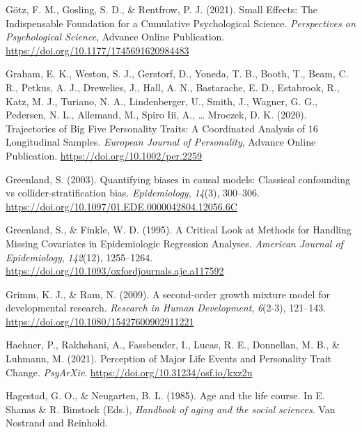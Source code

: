\documentclass[
  english,
  man,floatsintext]{apa7}
\begin{document}
\leavevmode\hypertarget{ref-gotzSmallEffectsIndispensable2021}{}%
Götz, F. M., Gosling, S. D., \& Rentfrow, P. J. (2021). Small Effects: The Indispensable Foundation for a Cumulative Psychological Science. \emph{Perspectives on Psychological Science}, Advance Online Publication. \url{https://doi.org/10.1177/1745691620984483}

\leavevmode\hypertarget{ref-grahamTrajectoriesBigFive2020}{}%
Graham, E. K., Weston, S. J., Gerstorf, D., Yoneda, T. B., Booth, T., Beam, C. R., Petkus, A. J., Drewelies, J., Hall, A. N., Bastarache, E. D., Estabrook, R., Katz, M. J., Turiano, N. A., Lindenberger, U., Smith, J., Wagner, G. G., Pedersen, N. L., Allemand, M., Spiro Iii, A., \ldots{} Mroczek, D. K. (2020). Trajectories of Big Five Personality Traits: A Coordinated Analysis of 16 Longitudinal Samples. \emph{European Journal of Personality}, Advance Online Publication. \url{https://doi.org/10.1002/per.2259}

\leavevmode\hypertarget{ref-greenlandQuantifyingBiasesCausal2003}{}%
Greenland, S. (2003). Quantifying biases in causal models: Classical confounding vs collider-stratification bias. \emph{Epidemiology}, \emph{14}(3), 300--306. \url{https://doi.org/10.1097/01.EDE.0000042804.12056.6C}

\leavevmode\hypertarget{ref-greenlandCriticalLookMethods1995}{}%
Greenland, S., \& Finkle, W. D. (1995). A Critical Look at Methods for Handling Missing Covariates in Epidemiologic Regression Analyses. \emph{American Journal of Epidemiology}, \emph{142}(12), 1255--1264. \url{https://doi.org/10.1093/oxfordjournals.aje.a117592}

\leavevmode\hypertarget{ref-grimmSecondorderGrowthMixture2009}{}%
Grimm, K. J., \& Ram, N. (2009). A second-order growth mixture model for developmental research. \emph{Research in Human Development}, \emph{6}(2-3), 121--143. \url{https://doi.org/10.1080/15427600902911221}

\leavevmode\hypertarget{ref-haehnerPerceptionMajorLife2021}{}%
Haehner, P., Rakhshani, A., Fassbender, I., Lucas, R. E., Donnellan, M. B., \& Luhmann, M. (2021). Perception of Major Life Events and Personality Trait Change. \emph{PsyArXiv}. \url{https://doi.org/10.31234/osf.io/kxz2u}

\leavevmode\hypertarget{ref-hagestadAgeLifeCourse1985}{}%
Hagestad, G. O., \& Neugarten, B. L. (1985). Age and the life course. In E. Shanas \& R. Binstock (Eds.), \emph{Handbook of aging and the social sciences}. Van Nostrand and Reinhold.
\end{document}
